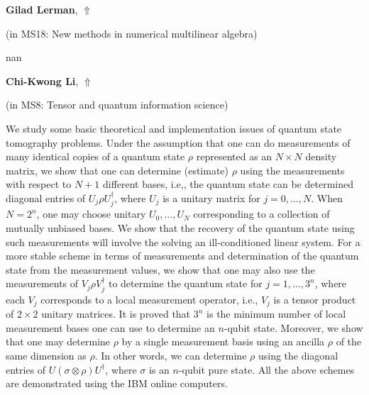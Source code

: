 \documentclass[ILAS2025-program.tex]{subfiles}
\begin{document}
\hypertarget{down0147}{}\begin{ilasabstract}
    
\textbf{Gilad Lerman},  \hfill \hyperlink{up0147}{$\Uparrow$}
    
    
(in {\color{mstitle}MS18: New methods in numerical multilinear algebra})
        
\mtskip
    nan
\end{ilasabstract}
    

\hypertarget{down0054}{}\begin{ilasabstract}
    
\textbf{Chi-Kwong Li},  \hfill \hyperlink{up0054}{$\Uparrow$}
    
    
(in {\color{mstitle}MS8: Tensor and quantum information science})
        
\mtskip
    We study some basic theoretical and implementation issues
of quantum state tomography problems.
Under the assumption that one can do 
measurements of many identical copies of a quantum state
$\rho$ represented as an $N\times N$ density matrix,
we show that one can determine (estimate) $\rho$ using the 
measurements with respect to $N+1$ different bases, 
i.e,,  the quantum state can be determined diagonal entries of 
$U_j\rho U_j^\dag$, where $U_j$ is a unitary matrix  for $j = 0, \dots, N$.
When $N = 2^n$, one may choose unitary $U_0, \dots, U_N$ corresponding
to a collection of mutually unbiased bases. We show that the recovery of the
quantum state using such measurements will involve the solving an 
ill-conditioned linear system. For a more stable scheme in terms of
measurements and determination of the quantum state from the measurement values,
we show that one may also use the measurements of 
$V_j \rho V_j^\dag$ to determine the quantum state for $j = 1, \dots, 3^n$,
where each $V_j$ corresponds to a local measurement operator,
i.e., $V_j$ is a tensor product of $2\times 2$ unitary matrices.
It is proved that $3^n$ is the minimum number of local measurement bases
one can use to determine an $n$-qubit state.
Moreover, we show that one may determine $\rho$ by a single measurement
basis using an ancilla $\rho$ of the same dimension as $\rho$.
In other words, we can determine $\rho$ using
the diagonal entries of $U(\sigma \otimes \rho)U^\dag$, where
$\sigma$ is an $n$-qubit pure state.
All the above schemes are demonstrated using the IBM online computers.

\end{ilasabstract}
    
\end{document}
